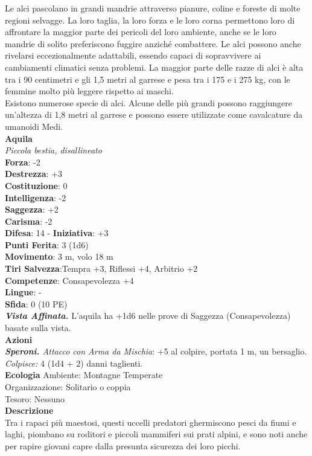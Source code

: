 \begin{multicols}{2}
Le alci pascolano in grandi mandrie attraverso pianure, coline e foreste di molte regioni selvagge. La loro taglia, la loro forza e le loro corna permettono loro di affrontare la maggior parte dei pericoli del loro ambiente, anche se le loro mandrie di solito preferiscono fuggire anziché combattere. Le alci possono anche rivelarsi eccezionalmente adattabili, essendo capaci di sopravvivere ai cambiamenti climatici senza problemi. La maggior parte delle razze di alci è alta tra i 90 centimetri e gli 1,5 metri al garrese e pesa tra i 175 e i 275 kg, con le femmine molto più leggere rispetto ai maschi.\\
Esistono numerose specie di alci. Alcune delle più grandi possono raggiungere un'altezza di 1,8 metri al garrese e possono essere utilizzate come cavalcature da umanoidi Medi.\\


\medskip\textbf{Aquila}\\
\emph{Piccola bestia, disallineato}\\
\textbf{Forza}: -2\\
\textbf{Destrezza}: +3\\
\textbf{Costituzione}: 0\\
\textbf{Intelligenza}: -2\\
\textbf{Saggezza}: +2\\
\textbf{Carisma}: -2\\
\textbf{Difesa}: 14 - \textbf{Iniziativa}: +3\\
\textbf{Punti Ferita}: 3 (1d6)\\
\textbf{Movimento}: 3 m, volo 18 m\\
\textbf{Tiri Salvezza}:Tempra +3, Riflessi +4, Arbitrio +2\\
\textbf{Competenze}: Consapevolezza +4\\
\textbf{Lingue}: -\\
\textbf{Sfida}: 0 (10 PE)\smallskip\\
\emph{\textbf{Vista Affinata.}} L'aquila ha +1d6 nelle prove di Saggezza (Consapevolezza) basate sulla vista.\\
\smallskip\textbf{Azioni}\\
\emph{\textbf{Speroni.} Attacco con Arma da Mischia}: +5 al colpire, portata 1 m, un bersaglio.\\
\emph{Colpisce:} 4 (1d4 + 2) danni taglienti.\\
\textbf{Ecologia}
Ambiente: Montagne Temperate\\
Organizzazione: Solitario o coppia\\
Tesoro: Nessuno\\
\textbf{Descrizione}\\
Tra i rapaci più maestosi, questi uccelli predatori ghermiscono pesci da fiumi e laghi, piombano su roditori e piccoli mammiferi sui prati alpini, e sono noti anche per rapire giovani capre dalla presunta sicurezza dei loro picchi.\\


\end{multicols}
